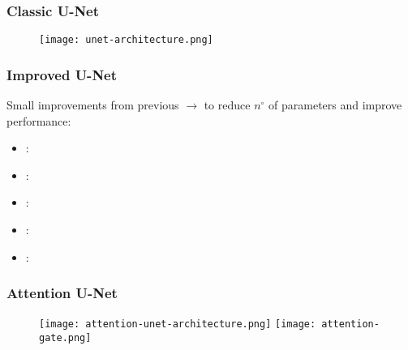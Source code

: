 \documentclass[../presentation.tex]{subfiles} %
\begin{document}
\begin{frame}

	\frametitle{Classic U-Net}

	\begin{figure}
		\centering
		\texttt{[image: unet-architecture.png]}
	\end{figure}

\end{frame}


\begin{frame}[t]

	\frametitle{Improved U-Net}

	Small improvements from previous $\rightarrow$ to reduce $n^{\circ}$ of
	parameters and improve performance:

	\vspace{4ex}

	\begin{itemize}
		 \setlength{\itemsep}{4ex}
		\item {}:  
		\item {}: 
		\item {}: 
		\item {}: 
		\item {}: 
	\end{itemize}

\end{frame}


\begin{frame}[t]

	\frametitle{Attention U-Net}


	\begin{figure}
		\centering
		\texttt{[image: attention-unet-architecture.png]}
		\texttt{[image: attention-gate.png]}
	\end{figure}

\end{frame}
\end{document}
